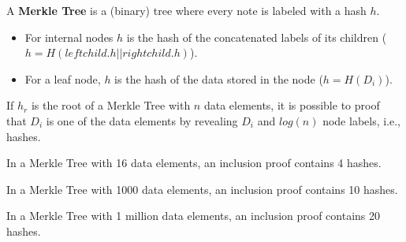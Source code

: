 \begin{definition}
	A \textbf{Merkle Tree} is a (binary) tree where every note is labeled with a hash $h$.
	\begin{itemize}
		\item For internal nodes $h$ is the hash of the concatenated labels of its children ($h=H(\mathit{leftchild}.h||\mathit{rightchild}.h)$).
		\item For a leaf node, $h$ is the hash of the data stored in the node ($h=H(D_i)$).
	\end{itemize}
\end{definition}

\begin{lem}
If $h_r$ is the root of a Merkle Tree with $n$ data elements, it is possible to proof that $D_i$ is one of the data elements by revealing $D_i$ and $log(n)$ node labels, i.e., hashes.
\end{lem}



\begin{example}
	In a Merkle Tree with 16 data elements, an inclusion proof contains 4 hashes.
	
	In a Merkle Tree with 1000 data elements, an inclusion proof contains 10 hashes.
	
	In a Merkle Tree with 1 million data elements, an inclusion proof contains 20 hashes.
\end{example}


